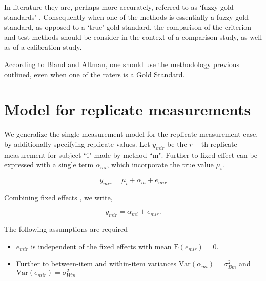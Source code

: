 \documentclass[12pt, a4paper]{report}
\theoremstyle{plain}
\theoremstyle{definition}
\theoremstyle{remark}
\begin{document}
	In literature they are, perhaps more accurately, referred to as
	`fuzzy gold standards' \citep{phelps}. Consequently when one of the methods is
	essentially a fuzzy gold standard, as opposed to a `true' gold
	standard, the comparison of the criterion and test methods should
	be consider in the context of a comparison study, as well as of a
	calibration study.
	
	
	
	
	According to Bland and Altman, one should use the methodology
	previous outlined, even when one of the raters is a Gold Standard.
	
	
	

	\section{Model for replicate measurements}
	
	We generalize the single measurement model for the replicate measurement case, by additionally specifying replicate values. Let $y_{mir}$ be the $r-$th replicate measurement for subject ``i" made by method ``m". Further to \citet{barnhart} fixed effect can be expressed with a single term $\alpha_{mi}$, which incorporate the true value $\mu_i$.
	
	\[ y_{mir} = \mu_{i} + \alpha_{m} + e_{mir}  \]
	
	Combining fixed effects \citep{barnhart}, we write,
	
	\[ y_{mir} = \alpha_{mi} + e_{mir}.\]
	
	The following assumptions are required
	
	\begin{itemize}
		\item $e_{mir}$ is independent of the fixed effects with mean $\mbox{E}(e_{mir}) = 0$.
		\item Further to \citet{barnhart} between-item and within-item variances $\mbox{Var}(\alpha_{mi}) = \sigma^2_{Bm}$ and $\mbox{Var}(e_{mir}) = \sigma^2_{Wm}$
		
	\end{itemize}
	
\end{document}
